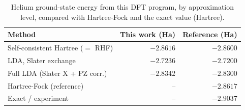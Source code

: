 \begin{table}[t]
  \centering
  \caption{Helium ground-state energy from this DFT program, by approximation level, compared with Hartree-Fock and the exact value (Hartree).}
  \label{tab:helium_energies}
  \begin{tabular}{lrr}
    \hline
    Method & This work (Ha) & Reference (Ha) \\
    \hline
    Self-consistent Hartree ($=$ RHF) & $-2.8616$ & $-2.8600$ \\
    LDA, Slater exchange & $-2.7236$ & $-2.7200$ \\
    Full LDA (Slater X + PZ corr.) & $-2.8342$ & $-2.8300$ \\
    Hartree-Fock (reference) & -- & $-2.8617$ \\
    Exact / experiment & -- & $-2.9037$ \\
    \hline
  \end{tabular}
\end{table}
